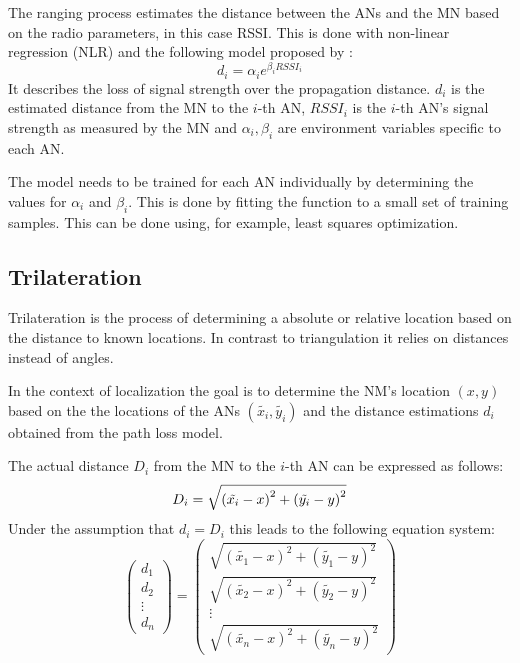 The ranging process estimates the distance between the ANs and the MN based on the radio parameters, in this case RSSI. This is done with non-linear regression (NLR) and the following model proposed by \cite{li2015passiveWIFIsource}:
\begin{equation} \label{eqn:non-linear path loss model}
d_{i}=\alpha_{i}e^{\beta_{i}RSSI_{i}}
\end{equation}
It describes the loss of signal strength over the propagation distance. \(d_{i}\) is the estimated distance from the MN to the \(i\)-th AN, \(RSSI_{i}\) is the \(i\)-th AN's signal strength as measured by the MN and \(\alpha_{i}, \beta_{i}\) are environment variables specific to each AN.

The model needs to be trained for each AN individually by determining the values for \(\alpha_{i}\) and \(\beta_{i}\). This is done by fitting the function to a small set of training samples. This can be done using, for example, least squares optimization.

\subsection{Trilateration}

Trilateration is the process of determining a absolute or relative location based on the distance to known locations. In contrast to triangulation it relies on distances instead of angles.

In the context of localization the goal is to determine the NM's location \(\left ( x,y \right )\) based on the the locations of the ANs \(\left ( \tilde{x_{i}},\tilde{y_{i}} \right )\) and the distance estimations \(d_{i}\) obtained from the path loss model.

The actual distance \(D_{i}\) from the MN to the \(i\)-th AN can be expressed as follows:
\begin{equation}
D_{i} = \sqrt{\left ( \tilde{x_{i}}-x \right )^{2}+\left ( \tilde{y_{i}}-y \right )^{2}}
\label{eqn: distance MN to AN_{i}}
\end{equation}
Under the assumption that \(d_{i}=D_{i}\)  this leads to the following equation system:
\begin{equation}
\begin{pmatrix}
d_{1}\\ 
d_{2}\\
\vdots\\
d_{n}
\end{pmatrix}
=
\begin{pmatrix}
\sqrt{\left ( \tilde{x_{1}}-x \right )^{2}+\left ( \tilde{y_{1}}-y \right )^{2}}\\
\sqrt{\left ( \tilde{x_{2}}-x \right )^{2}+\left ( \tilde{y_{2}}-y \right )^{2}} \\
\vdots\\
\sqrt{\left ( \tilde{x_{n}}-x \right )^{2}+\left ( \tilde{y_{n}}-y \right )^{2}}
\end{pmatrix}
\label{eqn: trilateration problem as equation system}
\end{equation}

